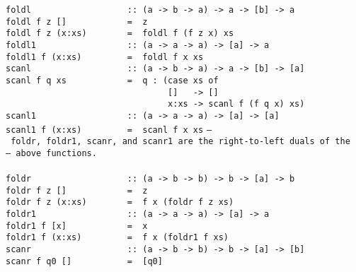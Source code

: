 \mbox{\tt foldl\ \ \ \ \ \ \ \ \ \ \ \ \ \ \ \ \ \ \ ::\ (a\ ->\ b\ ->\ a)\ ->\ a\ ->\ [b]\ ->\ a}\\
\mbox{\tt foldl\ f\ z\ []\ \ \ \ \ \ \ \ \ \ \ \ =\ \ z}\\
\mbox{\tt foldl\ f\ z\ (x:xs)\ \ \ \ \ \ \ \ =\ \ foldl\ f\ (f\ z\ x)\ xs}
%
\eprogB\noindent\bprogB
\mbox{\tt foldl1\ \ \ \ \ \ \ \ \ \ \ \ \ \ \ \ \ \ ::\ (a\ ->\ a\ ->\ a)\ ->\ [a]\ ->\ a}\\
\mbox{\tt foldl1\ f\ (x:xs)\ \ \ \ \ \ \ \ \ =\ \ foldl\ f\ x\ xs}
%
\eprogB\noindent\bprogB
\mbox{\tt scanl\ \ \ \ \ \ \ \ \ \ \ \ \ \ \ \ \ \ \ ::\ (a\ ->\ b\ ->\ a)\ ->\ a\ ->\ [b]\ ->\ [a]}\\
\mbox{\tt scanl\ f\ q\ xs\ \ \ \ \ \ \ \ \ \ \ \ =\ \ q\ :\ (case\ xs\ of}\\
\mbox{\tt \ \ \ \ \ \ \ \ \ \ \ \ \ \ \ \ \ \ \ \ \ \ \ \ \ \ \ \ \ \ \ \ []\ \ \ ->\ []}\\
\mbox{\tt \ \ \ \ \ \ \ \ \ \ \ \ \ \ \ \ \ \ \ \ \ \ \ \ \ \ \ \ \ \ \ \ x:xs\ ->\ scanl\ f\ (f\ q\ x)\ xs)}
%
\eprogB\noindent\bprogB
\mbox{\tt scanl1\ \ \ \ \ \ \ \ \ \ \ \ \ \ \ \ \ \ ::\ (a\ ->\ a\ ->\ a)\ ->\ [a]\ ->\ [a]}\\
\mbox{\tt scanl1\ f\ (x:xs)\ \ \ \ \ \ \ \ \ =\ \ scanl\ f\ x\ xs}
%
\eprogB\noindent\bprogB
\mbox{\tt --\ foldr,\ foldr1,\ scanr,\ and\ scanr1\ are\ the\ right-to-left\ duals\ of\ the}\\
\mbox{\tt --\ above\ functions.}\\
\mbox{\tt }\\[-8pt]
\mbox{\tt foldr\ \ \ \ \ \ \ \ \ \ \ \ \ \ \ \ \ \ \ ::\ (a\ ->\ b\ ->\ b)\ ->\ b\ ->\ [a]\ ->\ b}\\
\mbox{\tt foldr\ f\ z\ []\ \ \ \ \ \ \ \ \ \ \ \ =\ \ z}\\
\mbox{\tt foldr\ f\ z\ (x:xs)\ \ \ \ \ \ \ \ =\ \ f\ x\ (foldr\ f\ z\ xs)}
%
\eprogB\noindent\bprogB
\mbox{\tt foldr1\ \ \ \ \ \ \ \ \ \ \ \ \ \ \ \ \ \ ::\ (a\ ->\ a\ ->\ a)\ ->\ [a]\ ->\ a}\\
\mbox{\tt foldr1\ f\ [x]\ \ \ \ \ \ \ \ \ \ \ \ =\ \ x}\\
\mbox{\tt foldr1\ f\ (x:xs)\ \ \ \ \ \ \ \ \ =\ \ f\ x\ (foldr1\ f\ xs)}
%
\eprogB\noindent\bprogB
\mbox{\tt scanr\ \ \ \ \ \ \ \ \ \ \ \ \ \ \ \ \ \ \ ::\ (a\ ->\ b\ ->\ b)\ ->\ b\ ->\ [a]\ ->\ [b]}\\
\mbox{\tt scanr\ f\ q0\ []\ \ \ \ \ \ \ \ \ \ \ =\ \ [q0]}\\
